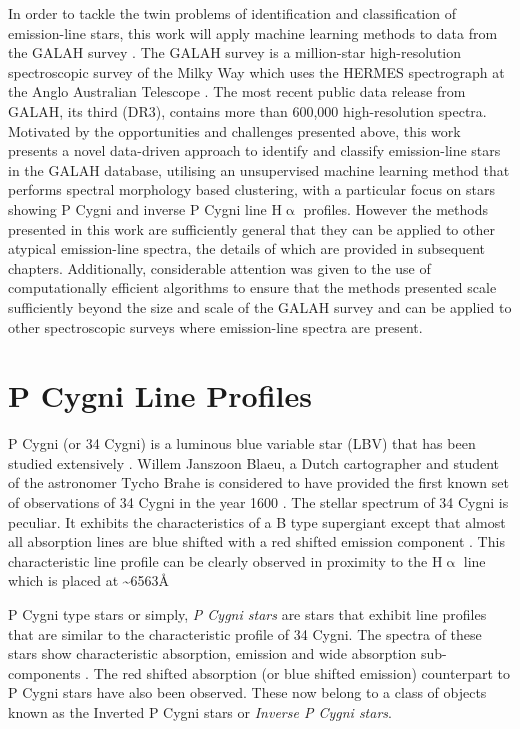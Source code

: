 In order to tackle the twin problems of identification and classification of emission-line stars, this work will apply machine learning methods to data from the GALAH survey \cite{buder2021galah+}. The GALAH survey is a million-star high-resolution spectroscopic survey of the Milky Way which uses the HERMES spectrograph at the Anglo Australian Telescope \cite{de2015galah}. The most recent public data release from GALAH, its third (DR3), contains more than 600,000 high-resolution spectra. Motivated by the opportunities and challenges presented above, this work presents a novel data-driven approach to identify and classify emission-line stars in the GALAH database, utilising an unsupervised machine learning method that performs spectral morphology based clustering, with a particular focus on stars showing P Cygni and inverse P Cygni line H$\upalpha$ profiles. However the methods presented in this work are sufficiently general that they can be applied to other atypical emission-line spectra, the details of which are provided in subsequent chapters. Additionally, considerable attention was given to the use of computationally efficient algorithms to ensure that the methods presented scale sufficiently beyond the size and scale of the GALAH survey and can be applied to other spectroscopic surveys where emission-line spectra are present. 

\section{P Cygni Line Profiles}
P Cygni (or 34 Cygni) is a luminous blue variable star (LBV) that has been studied extensively \cite{1953PDAO....9....1B}\cite{hutchings1969expanding}\cite{elliott20225}\cite{underhill1966supergiants}\cite{mizumoto2018newly}. Willem Janszoon Blaeu, a Dutch cartographer and student of the astronomer Tycho Brahe is considered to have provided the first known set of observations of 34 Cygni in the year 1600 \cite{deGrootPCygni}. The stellar spectrum of 34 Cygni is peculiar. It exhibits the characteristics of a B type supergiant except that almost all absorption lines are blue shifted with a red shifted emission component \cite{hutchings1969expanding}. This characteristic line profile can be clearly observed in proximity to the H$\upalpha$ line which is placed at \textasciitilde 6563\r{A} \cite{zhang2021catalog}\cite{traven2015gaia}

P Cygni type stars or simply, \emph{P Cygni stars} are stars that exhibit line profiles that are similar to the characteristic profile of 34 Cygni. The spectra of these stars show characteristic absorption, emission and wide absorption sub-components \cite{zhang2021catalog}. The red shifted absorption (or blue shifted emission) counterpart to P Cygni stars have also been observed. These now belong to a class of objects known as the Inverted P Cygni stars or \emph{Inverse P Cygni stars}. 

